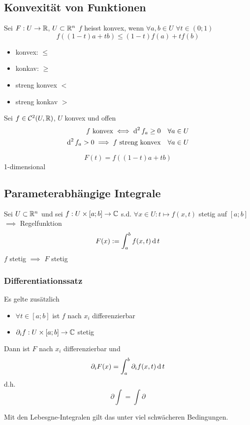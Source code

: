 \subsection{Konvexität von Funktionen}
\begin{Def}
  Sei $F:U\to \mathbb{R}$, $U\subset\mathbb{R}^n$ $f$ heisst konvex, wenn $\forall a,b\in U$ $\forall t\in (0;1)$
  \[f\left( \left( 1-t \right)a+tb \right)\leq \left( 1-t \right)f(a)+t f(b)\]
  \begin{itemize}
    \item konvex: $\leq$
    \item konkav: $\geq$
    \item streng konvex $<$
    \item streng konkav $>$
  \end{itemize}
\end{Def}
\begin{Sat}
  Sei $f\in\mathcal{C}^2(U,\mathbb{R})$, $U$ konvex und offen
  \begin{align*}
    f\ \text{konvex}\iff \operatorname{d}^2f_a\geq 0&&\forall a\in U\\
    \operatorname{d}^2f_a>0\implies f\ \text{streng konvex}&&\forall a\in U
  \end{align*}
\end{Sat}
\begin{Bew}
  \[F(t)=f\left( \left( 1-t \right)a+tb \right)\]
  1-dimensional
\end{Bew}
\subsection{Parameterabhängige Integrale}
\begin{Def}
  Sei $U\subset\mathbb{R}^n$ und sei $f:U\times [a;b]\to\mathbb{C}$ s.d. $\forall x\in U:t\mapsto f(x,t)$ stetig auf $[a;b]$ $\implies$ Regelfunktion
  \[F(x):=\int_a^bf(x,t)\operatorname{d} t\]
  $f$ stetig $\implies$ $F$ stetig
\end{Def}
\subsubsection{Differentiationssatz}
\begin{Sat}
  Es gelte zusätzlich
  \begin{itemize}
    \item $\forall t\in [a;b]$ ist $f$ nach $x_i$ differenzierbar
    \item $\partial_if:U\times [a;b]\to\mathbb{C}$ stetig
  \end{itemize}
  Dann ist $F$ nach $x_i$ differenzierbar und 
  \[\partial_i F(x)=\int_a^b\partial_if(x,t)\operatorname{d} t\]
  d.h.
  \[\partial\int=\int\partial\]
\end{Sat}
\begin{Bem}
  Mit den Lebesgne-Integralen gilt das unter viel schwächeren Bedingungen.
\end{Bem}
